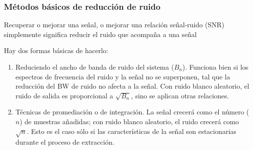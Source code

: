 \documentclass{beamer}
\begin{document}
\begin{frame}
\frametitle{M\'etodos b\'asicos de reducci\'on de ruido}
\begin{block}{}
Recuperar o mejorar una señal, o mejorar una relaci\'on señal-ruido (SNR) 
simplemente significa \alert{reducir el ruido que acompaña a una señal}
\end{block}
\begin{block}{Hay dos formas b\'asicas de hacerlo:}
\begin{enumerate}
\item Reduciendo el ancho de banda de ruido del sistema
($B_n$). Funciona bien si los espectros de frecuencia del ruido y la señal no se
superponen, tal que la reducci\'on del BW de ruido no afecta a la señal. Con ruido
blanco aleatorio, el ruido de salida es proporcional a $\sqrt{B_n}$, sino se
aplican otras relaciones.
\item T\'ecnicas de promediaci\'on o de integraci\'on. La señal crecer\'a como el n\'umero
($n$) de muestras añadidas; con ruido blanco aleatorio, el ruido crecer\'a como
$\sqrt{n}$. 
Esto es el caso s\'olo si las caracter\'isticas de la señal son estacionarias
durante el proceso de extracci\'on.
\end{enumerate}
\end{block}
\end{frame} 
\end{document}
